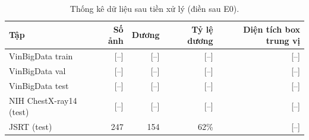 \begin{table}[H]
\centering
\caption{Thống kê dữ liệu sau tiền xử lý (điền sau E0).}
\label{tab:data-stats}
\small
\begin{tabular}{@{}lrrrr@{}}
\toprule
\textbf{Tập} & \textbf{Số ảnh} & \textbf{Dương} & \textbf{Tỷ lệ dương} & \textbf{Diện tích box trung vị} \\
\midrule
VinBigData train & \textcolor{badred}{[--]} & \textcolor{badred}{[--]} & \textcolor{badred}{[--]} & \textcolor{badred}{[--]} \\
VinBigData val   & \textcolor{badred}{[--]} & \textcolor{badred}{[--]} & \textcolor{badred}{[--]} & \textcolor{badred}{[--]} \\
VinBigData test  & \textcolor{badred}{[--]} & \textcolor{badred}{[--]} & \textcolor{badred}{[--]} & \textcolor{badred}{[--]} \\
NIH ChestX-ray14 (test) & \textcolor{badred}{[--]} & \textcolor{badred}{[--]} & \textcolor{badred}{[--]} & \textcolor{badred}{[--]} \\
JSRT (test)      & 247 & 154 & 62\% & \textcolor{badred}{[--]} \\
\bottomrule
\end{tabular}
\end{table}
